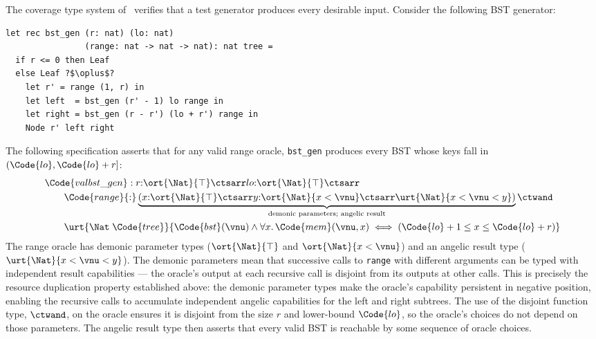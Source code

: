 \begin{example}\label{ex:coverage}
  The coverage type system of~\citet{CoverageType} verifies that a
  test generator produces every desirable input.  Consider the
  following BST generator:
\begin{verbatim}    
let rec bst_gen (r: nat) (lo: nat)
                (range: nat -> nat -> nat): nat tree =
  if r <= 0 then Leaf
  else Leaf ?$\oplus$?
    let r' = range (1, r) in
    let left  = bst_gen (r' - 1) lo range in
    let right = bst_gen (r - r') (lo + r') range in
    Node r' left right
\end{verbatim}
  The following specification asserts that for any valid range oracle,
  \texttt{bst\_gen} produces every BST whose keys fall in $(\Code{lo},
  \Code{lo}+r]$:
  \begin{align*}
    &\Code{val bst\_gen} :
      r{:}\ort{\Nat}{\top} \ctsarr lo{:}\ort{\Nat}{\top} \ctsarr
    \\&\quad\quad
      \Code{range}{:}\underbrace{(x{:}\ort{\Nat}{\top} \ctsarr
        y{:}\ort{\Nat}{x < \vnu} \ctsarr
        \urt{\Nat}{x < \vnu < y})}_{\text{demonic parameters; angelic result}}
      \ctwand
    \\&\quad\quad
      \urt{\Nat\;\Code{tree}}{\Code{bst}(\vnu) \land
        \forall x.\, \Code{mem}(\vnu, x) \iff
        (\Code{lo}+1 \leq x \leq \Code{lo}+r)}
  \end{align*}
  The range oracle has demonic parameter types ($\ort{\Nat}{\top}$ and
  $\ort{\Nat}{x < \vnu}$) and an angelic result type ($\urt{\Nat}{x <
    \vnu < y}$).  The demonic parameters mean that successive calls to
  \texttt{range} with different arguments can be typed with
  independent result capabilities — the oracle's output at each
  recursive call is disjoint from its outputs at other calls.  This is
  precisely the resource duplication property established above: the
  demonic parameter types make the oracle's capability persistent in
  negative position, enabling the recursive calls to accumulate
  independent angelic capabilities for the left and right subtrees.
  The use of the disjoint function type, $\ctwand$, on the oracle
  ensures it is disjoint from the size $r$ and lower-bound
  $\Code{lo}$, so the oracle's choices do not depend on those
  parameters.  The angelic result type then asserts that every valid
  BST is reachable by some sequence of oracle choices.
\end{example}

